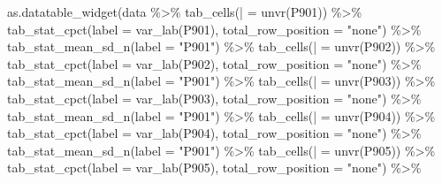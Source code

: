 \documentclass[
]{book}
\newenvironment{Shaded}{\begin{snugshade}}{\end{snugshade}}
\newcommand{\AttributeTok}[1]{\textcolor[rgb]{0.77,0.63,0.00}{#1}}
\newcommand{\FunctionTok}[1]{\textcolor[rgb]{0.00,0.00,0.00}{#1}}
\newcommand{\NormalTok}[1]{#1}
\newcommand{\OtherTok}[1]{\textcolor[rgb]{0.56,0.35,0.01}{#1}}
\newcommand{\SpecialCharTok}[1]{\textcolor[rgb]{0.00,0.00,0.00}{#1}}
\newcommand{\StringTok}[1]{\textcolor[rgb]{0.31,0.60,0.02}{#1}}
\begin{document}
\begin{Shaded}
\begin{Highlighting}[]
\FunctionTok{as.datatable\_widget}\NormalTok{(data }\SpecialCharTok{\%\textgreater{}\%}
  \FunctionTok{tab\_cells}\NormalTok{(}\StringTok{\textasciigrave{}}\AttributeTok{|}\StringTok{\textasciigrave{}} \OtherTok{=} \FunctionTok{unvr}\NormalTok{(P901)) }\SpecialCharTok{\%\textgreater{}\%}
  \FunctionTok{tab\_stat\_cpct}\NormalTok{(}\AttributeTok{label =} \FunctionTok{var\_lab}\NormalTok{(P901), }\AttributeTok{total\_row\_position =} \StringTok{"none"}\NormalTok{) }\SpecialCharTok{\%\textgreater{}\%}
  \FunctionTok{tab\_stat\_mean\_sd\_n}\NormalTok{(}\AttributeTok{label =} \StringTok{"P901"}\NormalTok{) }\SpecialCharTok{\%\textgreater{}\%}
  \FunctionTok{tab\_cells}\NormalTok{(}\StringTok{\textasciigrave{}}\AttributeTok{|}\StringTok{\textasciigrave{}} \OtherTok{=} \FunctionTok{unvr}\NormalTok{(P902)) }\SpecialCharTok{\%\textgreater{}\%}
  \FunctionTok{tab\_stat\_cpct}\NormalTok{(}\AttributeTok{label =} \FunctionTok{var\_lab}\NormalTok{(P902), }\AttributeTok{total\_row\_position =} \StringTok{"none"}\NormalTok{) }\SpecialCharTok{\%\textgreater{}\%}
  \FunctionTok{tab\_stat\_mean\_sd\_n}\NormalTok{(}\AttributeTok{label =} \StringTok{"P901"}\NormalTok{) }\SpecialCharTok{\%\textgreater{}\%}
  \FunctionTok{tab\_cells}\NormalTok{(}\StringTok{\textasciigrave{}}\AttributeTok{|}\StringTok{\textasciigrave{}} \OtherTok{=} \FunctionTok{unvr}\NormalTok{(P903)) }\SpecialCharTok{\%\textgreater{}\%}
  \FunctionTok{tab\_stat\_cpct}\NormalTok{(}\AttributeTok{label =} \FunctionTok{var\_lab}\NormalTok{(P903), }\AttributeTok{total\_row\_position =} \StringTok{"none"}\NormalTok{) }\SpecialCharTok{\%\textgreater{}\%}
  \FunctionTok{tab\_stat\_mean\_sd\_n}\NormalTok{(}\AttributeTok{label =} \StringTok{"P901"}\NormalTok{) }\SpecialCharTok{\%\textgreater{}\%}
  \FunctionTok{tab\_cells}\NormalTok{(}\StringTok{\textasciigrave{}}\AttributeTok{|}\StringTok{\textasciigrave{}} \OtherTok{=} \FunctionTok{unvr}\NormalTok{(P904)) }\SpecialCharTok{\%\textgreater{}\%}
  \FunctionTok{tab\_stat\_cpct}\NormalTok{(}\AttributeTok{label =} \FunctionTok{var\_lab}\NormalTok{(P904), }\AttributeTok{total\_row\_position =} \StringTok{"none"}\NormalTok{) }\SpecialCharTok{\%\textgreater{}\%}
  \FunctionTok{tab\_stat\_mean\_sd\_n}\NormalTok{(}\AttributeTok{label =} \StringTok{"P901"}\NormalTok{) }\SpecialCharTok{\%\textgreater{}\%}
  \FunctionTok{tab\_cells}\NormalTok{(}\StringTok{\textasciigrave{}}\AttributeTok{|}\StringTok{\textasciigrave{}} \OtherTok{=} \FunctionTok{unvr}\NormalTok{(P905)) }\SpecialCharTok{\%\textgreater{}\%}
  \FunctionTok{tab\_stat\_cpct}\NormalTok{(}\AttributeTok{label =} \FunctionTok{var\_lab}\NormalTok{(P905), }\AttributeTok{total\_row\_position =} \StringTok{"none"}\NormalTok{) }\SpecialCharTok{\%\textgreater{}\%}

\end{Highlighting}
\end{Shaded}
\end{document}
